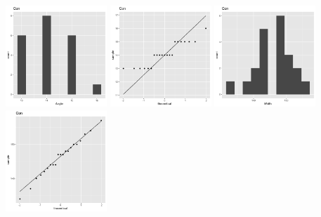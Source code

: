 \begin{center}
	\includegraphics[width=1.5in]{1_Con_a_hist.png}
	\includegraphics[width=1.5in]{1_Con_a_qq.png}
	\includegraphics[width=1.5in]{1_Con_w_hist.png}
	\includegraphics[width=1.5in]{1_Con_w_qq.png}
\end{center}
